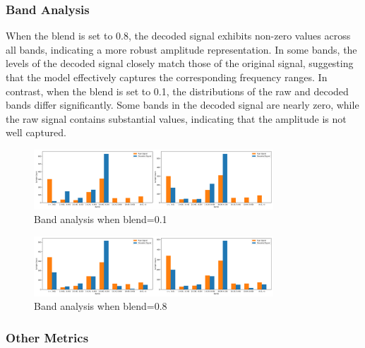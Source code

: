 \subsubsection{Band Analysis} When the blend is set to 0.8, the decoded signal exhibits non-zero values across all bands, indicating a more robust amplitude representation. In some bands, the levels of the decoded signal closely match those of the original signal, suggesting that the model effectively captures the corresponding frequency ranges. In contrast, when the blend is set to 0.1, the distributions of the raw and decoded bands differ significantly. Some bands in the decoded signal are nearly zero, while the raw signal contains substantial values, indicating that the amplitude is not well captured.
%
\begin{figure}[ht]
    \centering
    \includegraphics[width=0.8\textwidth]{static/band_analysis_blend_01_resized.png}
    \caption{Band analysis when blend=0.1}
    \label{fig:band_analysis_01}
\end{figure}
%

%
\begin{figure}[ht]
    \centering
    \includegraphics[width=0.8\textwidth]{static/band_analysis_blend_08_resized.png}
    \caption{Band analysis when blend=0.8}
    \label{fig:band_analysis_08}
\end{figure}
%

\subsubsection{Other Metrics}

